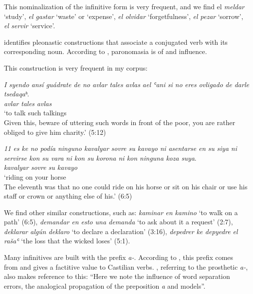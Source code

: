 \documentclass[output=paper,colorlinks,citecolor=brown,babel,arabicfont]{langscibook}
\begin{document}
This nominalization of the infinitive form is very frequent, and we find el \textit{meldar} `study', \textit{el gastar} `waste' or `expense', \textit{el olvidar} `forgetfulness', \textit{el pezar} `sorrow', \textit{el servir} `service'.

\label{ch3.7.ss.3.3.5.3}

\citet[245]{bornes-varol2008} identifies pleonastic constructions that associate a conjugated verb with its corresponding noun. According to \citet[250]{sola-sole1983}, paronomasia is of  and  influence. 

This construction is very frequent in my corpus:

\ea\label{ch3.7.ex.n55}
\textit{I syendo ansí guádrate de no avlar tales avlas ael ʿani si no eres ovligado de darle tsedaqaʰ}. \\
\textit{avlar  tales avlas} \\
`to talk such talkings \\
Given this, beware of uttering such words in front of the poor, you are rather obliged to give him charity.' (5:12)
\z

\ea\label{ch3.7.ex.n56}
\textit{11 es ke no podía ninguno kavalyar sovre su kavayo ni asentarse en su siya ni servirse kon su vara ni kon su korona ni kon ninguna koza suya}. \\
\textit{kavalyar sovre su kavayo} \\
`riding  on your horse \\
The eleventh was that no one could ride on his horse or sit on his chair or use his staff or crown or anything else of his.' (6:5)
\z

We find other similar constructions, such as: \textit{kaminar en kamino} `to walk on a path' (6:5), \textit{demandar en esto una demanda} `to ask about it a request' (2:7), \textit{deklarar algún deklaro} `to declare a declaration' (3:16), \textit{depedrer ke depyedre el rašaʿ} `the loss that the wicked loses' (5:1). 

\label{ch3.7.ss.3.3.5.4}


Many  infinitives are built with the prefix \textit{a-}. According to \citet[148]{lapesa1991}, this prefix comes from  and gives a factitive value to Castilian verbs. \citet[27]{hanssen1966}, referring to the prosthetic \textit{a-}, also makes reference to this: ``Here we note the influence of word separation errors, the analogical propagation of the preposition \textit{a} and  models''.  
\end{document}
